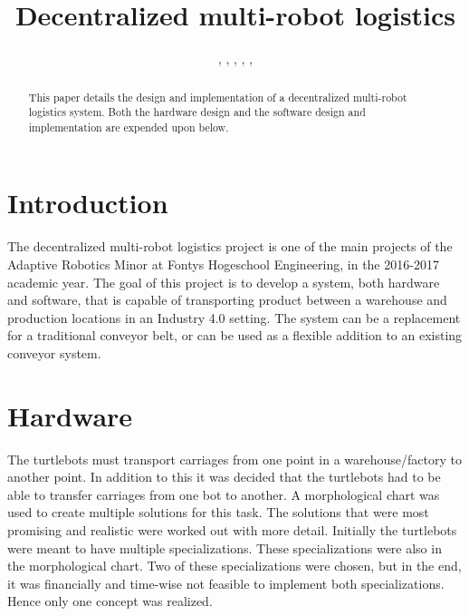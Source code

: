 \documentclass[10pt, journal]{IEEEtran}
\author{\IEEEauthorblockN{Remco Aarts}, 
 \IEEEauthorblockN{Jeroen van den Akker}, 
 \IEEEauthorblockN{Robert Delmaar}, 
 \IEEEauthorblockN{Bas Janssen},
 \IEEEauthorblockN{Addie Perenboom},
 \IEEEauthorblockN{Dimitri Waard}}
\title{Decentralized multi-robot logistics}
\begin{document}
\maketitle

\begin{abstract}
This paper details the design and implementation of a decentralized multi-robot logistics system. Both the hardware design and the software design and implementation are expended upon below.
\end{abstract}
\begin{IEEEkeywords}

\end{IEEEkeywords}

\section{Introduction}
The decentralized multi-robot logistics project is one of the main projects of the Adaptive Robotics Minor at Fontys Hogeschool Engineering, in the 2016-2017 academic year. The goal of this project is to develop a system, both hardware and software, that is capable of transporting product between a warehouse and production locations in an Industry 4.0 setting. The system can be a replacement for a traditional conveyor belt, or can be used as a flexible addition to an existing conveyor system.

\section{Hardware}
The turtlebots must transport carriages from one point in a warehouse/factory to another point. In addition to this it was decided that the turtlebots had to be able to transfer carriages from one bot to another. A morphological chart was used to create multiple solutions for this task. The solutions that were most promising and realistic were worked out with more detail. Initially the turtlebots were meant to have multiple specializations. These specializations were also in the morphological chart. Two of these specializations were chosen, but in the end, it was financially and time-wise not feasible to implement both specializations. Hence only one concept was realized.
\end{document}
